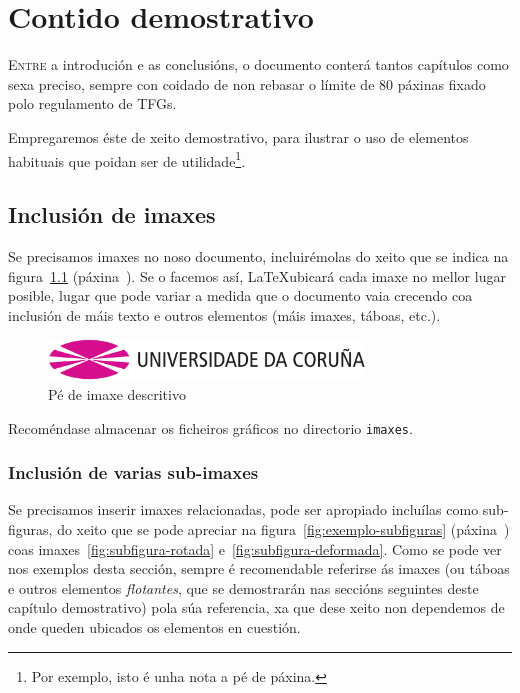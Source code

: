 \chapter{Contido demostrativo}
\label{chap:demo}

\lettrine{E}{ntre} a introdución e as conclusións, o documento conterá
tantos capítulos como sexa preciso, sempre con coidado de non rebasar
o límite de 80 páxinas fixado polo regulamento de TFGs.

Empregaremos éste de xeito demostrativo, para ilustrar o uso de
elementos habituais que poidan ser de utilidade\footnote{Por exemplo,
  isto é unha nota a pé de páxina.}.

\section{Inclusión de imaxes}

Se precisamos imaxes no noso documento, incluirémolas do xeito que se
indica na figura~\ref{fig:exemplo} (páxina~\pageref{fig:exemplo}). Se
o facemos así, \LaTeX ubicará cada imaxe no mellor lugar posible,
lugar que pode variar a medida que o documento vaia crecendo coa
inclusión de máis texto e outros elementos (máis imaxes, táboas,
etc.).

\begin{figure}[hp!]
  \centering
  \includegraphics[width=0.75\textwidth]{imaxes/udc.png}
  \caption{Pé de imaxe descritivo}
  \label{fig:exemplo}
\end{figure}

Recoméndase almacenar os ficheiros gráficos no directorio
\texttt{imaxes}.

\subsection{Inclusión de varias sub-imaxes}

Se precisamos inserir imaxes relacionadas, pode ser apropiado
incluílas como sub-figuras, do xeito que se pode apreciar na
figura~\ref{fig:exemplo-subfiguras} (páxina~\pageref{fig:exemplo-subfiguras})
coas imaxes~\ref{fig:subfigura-rotada} e~\ref{fig:subfigura-deformada}.
Como se pode ver nos exemplos desta sección, sempre é recomendable
referirse ás imaxes (ou táboas e outros elementos \emph{flotantes},
que se demostrarán nas seccións seguintes deste capítulo demostrativo)
pola súa referencia, xa que dese xeito non dependemos de onde
queden ubicados os elementos en cuestión.

